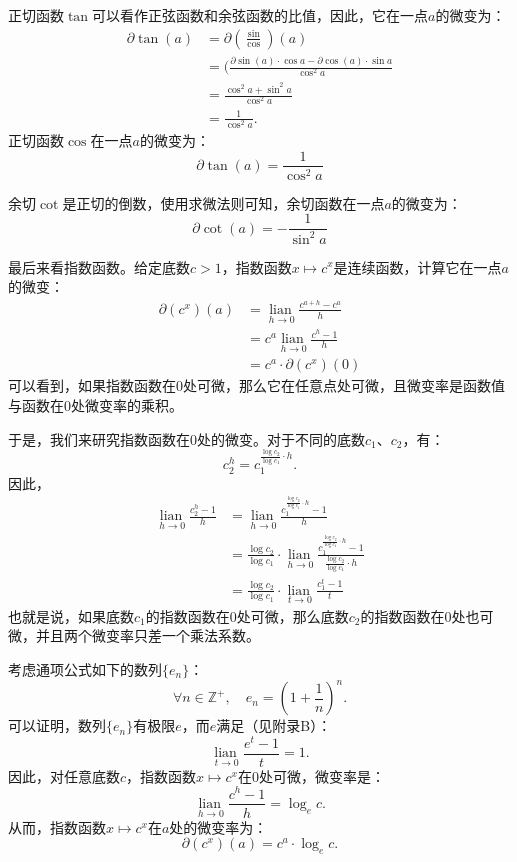\documentclass[12pt,UTF8]{ctexbook}
\newcommand{\lian}[1]{
    \underset{#1}{\operatorname{lian}\,}
}
\theoremstyle{definition}
\theoremstyle{plain}
\begin{document}
正切函数$\tan$可以看作正弦函数和余弦函数的比值，因此，它在一点$a$的微变为：
\begin{align*}
    \partial \tan(a) &= \partial \left(\frac{\sin}{\cos}\right)(a)  \\
    &= (\frac{\partial \sin(a) \cdot \cos{a} - \partial \cos(a) \cdot \sin{a}}{\cos^2{a}}  \\
    &= \frac{\cos^2{a} + \sin^2{a}}{\cos^2{a}}  \\
    &= \frac{1}{\cos^2{a}}.  
\end{align*}
正切函数$\cos$在一点$a$的微变为：
$$ \partial \tan(a) = \frac{1}{\cos^2{a}} $$

余切$\cot$是正切的倒数，使用求微法则可知，余切函数在一点$a$的微变为：
$$ \partial \cot(a) = -\frac{1}{\sin^2{a}} $$

最后来看指数函数。给定底数$c > 1$，指数函数$x\mapsto c^x$是连续函数，计算它在一点$a$的微变：
\begin{align*}
    \partial (c^x) (a) &= \lian{h\to 0} \frac{c^{a+h} - c^a}{h}  \\
    &= c^a \lian{h\to 0} \frac{c^h - 1}{h}  \\
    &= c^a \cdot \partial (c^x) (0) 
\end{align*}
可以看到，如果指数函数在$0$处可微，那么它在任意点处可微，且微变率是函数值与函数在$0$处微变率的乘积。

于是，我们来研究指数函数在$0$处的微变。对于不同的底数$c_1$、$c_2$，有：
$$c_2^h = c_1^{\frac{\log{c_2}}{\log{c_1}}\cdot h}.$$
因此，
\begin{align*}
    \lian{h\to 0} \frac{c_2^h - 1}{h} &= \lian{h\to 0} \frac{c_1^{\frac{\log{c_2}}{\log{c_1}}\cdot h} - 1}{h}  \\
    &= \frac{\log{c_2}}{\log{c_1}} \cdot \lian{h\to 0} \frac{c_1^{\frac{\log{c_2}}{\log{c_1}}\cdot h} - 1}{\frac{\log{c_2}}{\log{c_1}} \cdot h}  \\
    &= \frac{\log{c_2}}{\log{c_1}} \cdot \lian{t\to 0} \frac{c_1^{t} - 1}{t}  
\end{align*}
也就是说，如果底数$c_1$的指数函数在$0$处可微，那么底数$c_2$的指数函数在$0$处也可微，并且两个微变率只差一个乘法系数。

考虑通项公式如下的数列$\{e_n\}$：
$$ \forall n\in\mathbb{Z}^+,\quad e_n = \left(1 + \frac{1}{n}\right)^n.$$
可以证明，数列$\{e_n\}$有极限$e$，而$e$满足（见附录B）：
$$ \lian{t\to 0} \frac{e^{t} - 1}{t} = 1.$$
因此，对任意底数$c$，指数函数$x\mapsto c^x$在$0$处可微，微变率是：
$$ \lian{h\to 0} \frac{c^h - 1}{h} = \log_e{c}.$$
从而，指数函数$x\mapsto c^x$在$a$处的微变率为：
$$ \partial (c^x) (a) = c^a \cdot \log_e{c}. $$
\end{document}
